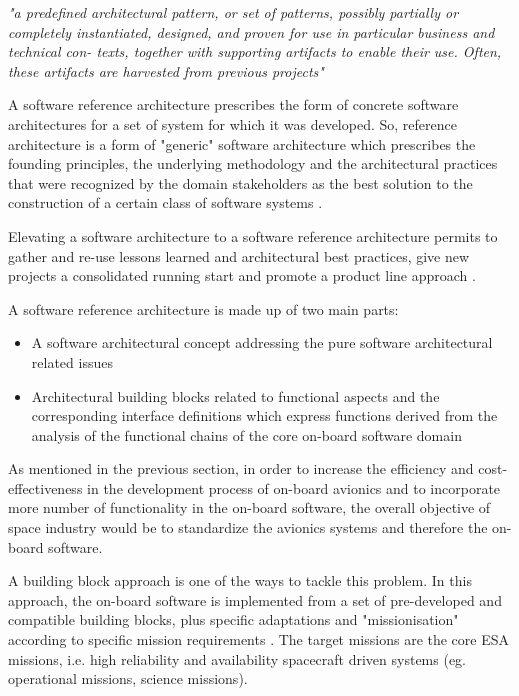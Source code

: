 \textit{"a predefined architectural pattern, or set of patterns, possibly partially or
completely instantiated, designed, and proven for use in particular business and technical con-
texts, together with supporting artifacts to enable their use. Often, these artifacts are harvested
from previous projects"} 

A software reference architecture prescribes the form of concrete software architectures for a set of system for which it was developed. So, reference architecture is a form of "generic" software architecture which prescribes the founding principles, the underlying methodology and the architectural practices that were recognized by the domain stakeholders as the best solution to the construction of a certain class of software systems \cite{PhdThesis} \cite{SoftRefArch}.

Elevating a software architecture to a software reference architecture permits to gather and re-use lessons learned and architectural best practices, give new projects a consolidated running start and promote a product line approach \cite{SAVOIR}.

A software reference architecture is made up of two main parts: \cite{SAVOIR}

\begin{itemize}
\item A software architectural concept addressing the pure software architectural related issues
\item Architectural building blocks related to functional aspects and the corresponding interface definitions which express functions derived from the analysis of the functional chains of the core on-board software domain 
\end{itemize} 

As mentioned in the previous section, in order to increase the efficiency and cost-effectiveness in the development process of on-board avionics and to incorporate more number of functionality in the on-board software, the overall objective of space industry would be to standardize the avionics systems and therefore the on-board software.

A building block approach is one of the ways to tackle this problem. In this approach, the on-board software is implemented from a set of pre-developed and compatible building blocks, plus specific adaptations and "missionisation" according to specific mission requirements \cite{SAVOIR}. The target missions are the core ESA missions, i.e. high reliability and availability spacecraft driven systems (eg. operational missions, science missions).

